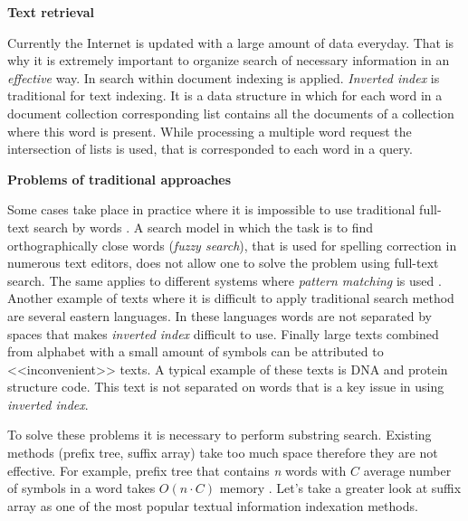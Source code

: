 
\textbf{Text retrieval}

Currently the Internet is updated with a large amount of data everyday.
That is why it is extremely important to organize search of necessary information in an \emph{effective} way.
In search within document indexing is applied.
\emph{Inverted index} is traditional for text indexing.
It is a data structure in which for each word in a document collection corresponding list
contains all the documents of a collection where this word is present.
While processing a multiple word request the intersection of lists is used,
that is corresponded to each word in a query.

\textbf{Problems of traditional approaches}

Some cases take place in practice where it is impossible to use
traditional full-text search by words \cite{bast2013efficient}.
A search model in which the task is to find orthographically close words (\emph{fuzzy search}),
that is used for spelling correction in numerous text editors,
does not allow one to solve the problem using full-text search.
The same applies to different systems where \emph{pattern matching} is used \cite{bai2018adaptive}.
Another example of texts where it is difficult to apply traditional search method
are several eastern languages.
In these languages words are not separated by spaces that makes \emph{inverted index} difficult to use.
Finally large texts combined from alphabet with a small amount of symbols can be attributed to <<inconvenient>> texts.
A typical example of these texts is DNA and protein structure code.
This text is not separated on words that is a key issue in using \emph{inverted index}.

To solve these problems it is necessary to perform substring search.
Existing methods (prefix tree, suffix array) take too much space therefore they are not effective.
For example, prefix tree that contains \emph{n} words with $C$ average number of symbols in a word
takes $O(n \cdot C)$ memory \cite{aho1975efficient}.
Let's take a greater look at suffix array as one of the most popular textual information indexation methods.

